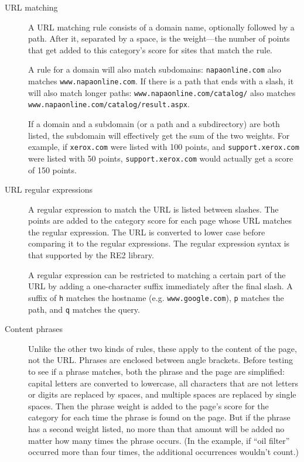 \documentclass{article}
\begin{document}
\begin{description}

\item[URL matching] A URL matching rule consists of a domain name, optionally followed by a path. 
After it, separated by a space, is the weight---the number of points that get added to this category's score 
for sites that match the rule. 

A rule for a domain will also match subdomains: \verb"napaonline.com" also matches \verb"www.napaonline.com".
If there is a path that ends with a slash,
it will also match longer paths: \verb"www.napaonline.com/catalog/" also matches 
\verb"www.napaonline.com/catalog/result.aspx".

If a domain and a subdomain (or a path and a subdirectory) 
are both listed, the subdomain will effectively get the sum of the two weights. For example, if \verb"xerox.com"
were listed with 100 points, and \verb"support.xerox.com" were listed with 50 points, \verb"support.xerox.com" 
would actually get a score of 150 points.

\item[URL regular expressions] A regular expression to match the URL is listed between slashes. 
The points are added to the category score for each page whose URL matches the regular expression. 
The URL is converted to lower case before comparing it to the regular expressions.
The regular expression syntax is that supported by the RE2 library.

A regular expression can be restricted to matching a certain part of the URL by adding a one-character suffix
immediately after the final slash.
A suffix of \verb"h" matches the hostname (e.g. \verb"www.google.com"), 
\verb"p" matches the path,
and \verb"q" matches the query.

\item[Content phrases] Unlike the other two kinds of rules, these apply to the content of the page, not the URL. 
Phrases are enclosed between angle brackets. Before testing to see if a phrase matches, 
both the phrase and the page are simplified: capital letters are converted to lowercase, 
all characters that are not letters or digits are replaced by spaces,
and multiple spaces are replaced by single spaces. Then the phrase weight is added to the page's score for the category 
for each time the phrase is found on the page. But if the phrase has a second weight listed, 
no more than that amount will be added no matter how many times the phrase occurs. 
(In the example, if ``oil filter'' occurred more than four times, the additional occurrences wouldn't count.)

\end{description}
\end{document}
